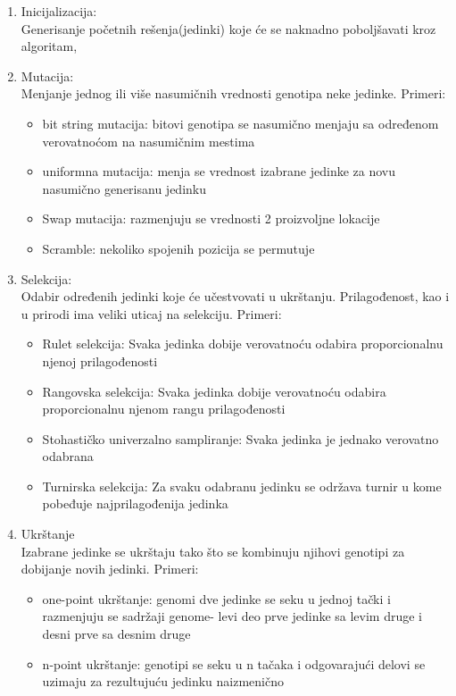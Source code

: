 \documentclass[a4paper]{article}
\begin{document}
\begin{enumerate}

\item Inicijalizacija:\\ Generisanje početnih rešenja(jedinki) koje će se naknadno poboljšavati kroz algoritam,
\item Mutacija: \\ Menjanje jednog ili više nasumičnih vrednosti genotipa neke jedinke. Primeri:
\begin{itemize}
\item bit string mutacija: bitovi genotipa se nasumično menjaju sa određenom verovatnoćom na nasumičnim mestima
\item uniformna mutacija: menja se vrednost izabrane jedinke za novu nasumično generisanu jedinku
\item Swap mutacija: razmenjuju se vrednosti 2 proizvoljne lokacije
\item Scramble: nekoliko spojenih pozicija se permutuje
\end{itemize}
\item Selekcija: \\ Odabir određenih jedinki koje će učestvovati u ukrštanju. Prilagođenost, kao i u prirodi ima veliki uticaj na selekciju. Primeri:
\begin{itemize}
\item Rulet selekcija: Svaka jedinka dobije verovatnoću odabira proporcionalnu njenoj prilagođenosti
\item Rangovska selekcija: Svaka jedinka dobije verovatnoću odabira proporcionalnu njenom rangu prilagođenosti
\item Stohastičko univerzalno sampliranje: Svaka jedinka je jednako verovatno odabrana
\item Turnirska selekcija: Za svaku odabranu jedinku se održava turnir u kome pobeđuje najprilagođenija jedinka
\end{itemize}
\item Ukrštanje \\ Izabrane jedinke se ukrštaju tako što se kombinuju njihovi genotipi za dobijanje novih jedinki. Primeri:
\begin{itemize}
\item one-point ukrštanje: genomi dve jedinke se seku u jednoj tački i razmenjuju se sadržaji genome- levi deo prve jedinke sa levim druge i desni prve sa desnim druge
\item n-point ukrštanje: genotipi se seku u n tačaka i odgovarajući delovi se uzimaju za rezultujuću jedinku naizmenično

\end{itemize}
\end{enumerate}
\end{document}
